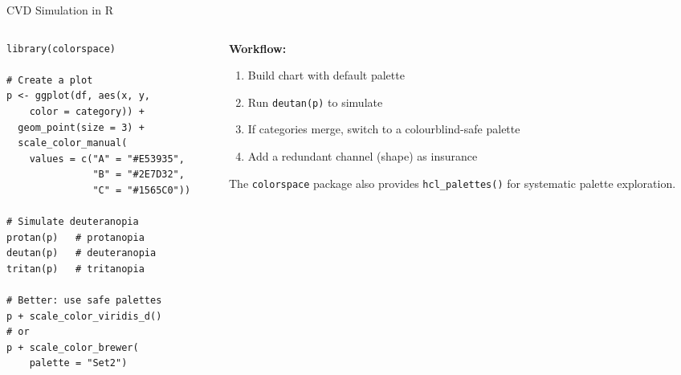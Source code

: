 \documentclass[10pt]{beamer}
\begin{document}
\begin{frame}[fragile]{CVD Simulation in R}
  \begin{columns}[T]
    \begin{column}{0.52\textwidth}
\begin{lstlisting}[style=rstyle]
library(colorspace)

# Create a plot
p <- ggplot(df, aes(x, y,
    color = category)) +
  geom_point(size = 3) +
  scale_color_manual(
    values = c("A" = "#E53935",
               "B" = "#2E7D32",
               "C" = "#1565C0"))

# Simulate deuteranopia
protan(p)   # protanopia
deutan(p)   # deuteranopia
tritan(p)   # tritanopia

# Better: use safe palettes
p + scale_color_viridis_d()
# or
p + scale_color_brewer(
    palette = "Set2")
\end{lstlisting}
    \end{column}
    \begin{column}{0.45\textwidth}
      \textbf{Workflow:}

      \begin{enumerate}
        \item Build chart with default palette
        \item Run \texttt{deutan(p)} to simulate
        \item If categories merge, switch to
              a colourblind-safe palette
        \item Add a redundant channel (shape)
              as insurance
      \end{enumerate}

      \vspace{4pt}
      {\small The \texttt{colorspace} package also
      provides \texttt{hcl\_palettes()} for
      systematic palette exploration.}
    \end{column}
  \end{columns}
\end{frame}
\end{document}
